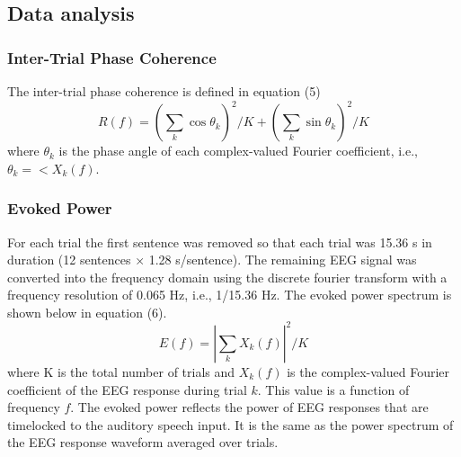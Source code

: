 \documentclass[10pt,letterpaper]{article}
\begin{document}
\subsection*{Data analysis}


\subsubsection*{Inter-Trial Phase Coherence}

The inter-trial phase coherence is defined in equation (5)
\begin{equation}
\label{eq:itpc}
R(f)=\left(\sum_k{\cos{\theta_k}}\right)^2/K+\left(\sum_k{\sin{\theta_k}}\right)^2/K
\end{equation}
where $\theta_k$ is the phase angle of each complex-valued Fourier coefficient, i.e., $\theta_k = < X_k(f)$.


\subsubsection*{Evoked Power}

For each trial the first sentence was removed so that each trial was
15.36 s in duration (12 sentences × 1.28 s/sentence). The remaining
EEG signal was converted into the frequency domain using the discrete
fourier transform with a frequency resolution of 0.065 Hz, i.e.,
1/15.36 Hz. The evoked power spectrum is shown below in equation (6).
\begin{equation}
\label{eq:power}
E(f)=\left|\sum_k{X{_k}(f)}\right|^2 / K
\end{equation}
where K is the total number of trials and $X_k(f)$ is the complex-valued
Fourier coefficient of the EEG response during trial $k$. This value is
a function of frequency $f$. The evoked power reflects the power of EEG
responses that are timelocked to the auditory speech input. It is the
same as the power spectrum of the EEG response waveform averaged over
trials.
\end{document}
